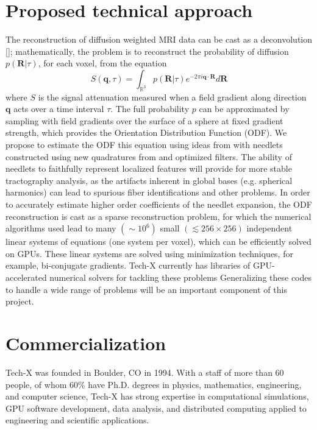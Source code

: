 \documentclass[10pt]{article}
\begin{document}
\section*{Proposed technical approach}
The reconstruction of diffusion weighted MRI data can be cast as a
deconvolution [\cite{Lenglet2008, JIA-VEM-2007}]; mathematically, the problem is
to reconstruct the probability of diffusion $p({\mathbf R}|\tau)$, for each
voxel, from the equation
\begin{equation*}
  S\left({\mathbf q},\tau\right) = \int_{\mathbb{R}^3} p({\mathbf R}|\tau)
e^{-2\pi i {\mathbf q}\cdot {\mathbf R}} d{\mathbf R}
\end{equation*}
where $S$ is the signal attenuation measured when a field gradient along
direction ${\mathbf q}$ acts over a time interval $\tau$.  The full probability
$p$ can be approximated by sampling with field gradients over the surface of a
sphere at fixed gradient strength, which provides the Orientation Distribution
Function (ODF). We propose to estimate the ODF this equation using ideas from
\cite{KE-NG-PI-2009} with needlets constructed using new quadratures from
\cite{AHR-BEY-2009} and optimized filters.  The ability of needlets to
faithfully represent localized features will provide for more stable
tractography analysis, as the artifacts inherent in global bases
(e.g. spherical harmonics) can lead to spurious fiber identifications and other
problems.  In order to accurately estimate higher order coefficients of the
needlet expansion, the ODF reconstruction is cast as a sparse reconstruction
problem, for which the numerical algorithms used lead to many $(\sim 10^6)$
small $(\lesssim 256\times256)$ independent linear systems of equations (one
system per voxel), which can be efficiently solved on GPUs. These linear systems are
solved using minimization techniques, for example, bi-conjugate gradients. Tech-X currently
has libraries of GPU-accelerated numerical solvers for tackling these problems
Generalizing these codes to handle a wide range of problems will be an important
component of this project.

\section*{Commercialization}
Tech-X was founded in Boulder, CO in 1994. With a staff of more than 60 people,
of whom 60\% have Ph.D. degrees in physics, mathematics, engineering, and
computer science, Tech-X has strong expertise in computational simulations, GPU
software development, data analysis, and distributed computing applied to
engineering and scientific applications.
\end{document}
